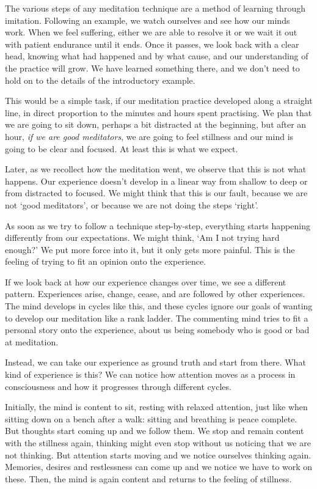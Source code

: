 The various steps of any meditation technique are a method of learning
through imitation. Following an example, we watch ourselves and see how
our minds work. When we feel suffering, either we are able to resolve it
or we wait it out with patient endurance until it ends. Once it passes,
we look back with a clear head, knowing what had happened and by what
cause, and our understanding of the practice will grow. We have learned
something there, and we don't need to hold on to the details of the
introductory example.


This would be a simple task, if our meditation practice developed along
a straight line, in direct proportion to the minutes and hours spent
practising. We plan that we are going to sit down, perhaps a bit
distracted at the beginning, but after an hour, \emph{if we are good
meditators}, we are going to feel stillness and our mind is going to be
clear and focused. At least this is what we expect.

Later, as we recollect how the meditation went, we observe that this is
not what happens. Our experience doesn't develop in a linear way from
shallow to deep or from distracted to focused. We might think that this
is our fault, because we are not `good meditators', or because we are
not doing the steps `right'.

As soon as we try to follow a technique step-by-step, everything starts
happening differently from our expectations. We might think, `Am I not
trying hard enough?' We put more force into it, but it only gets more
painful. This is the feeling of trying to fit an opinion onto the
experience.

If we look back at how our experience changes over time, we see a
different pattern. Experiences arise, change, cease, and are followed by
other experiences. The mind develops in cycles like this, and these
cycles ignore our goals of wanting to develop our meditation like a rank
ladder. The commenting mind tries to fit a personal story onto the
experience, about us being somebody who is good or bad at meditation.

Instead, we can take our experience as ground truth and start from
there. What kind of experience is this? We can notice how attention
moves as a process in consciousness and how it progresses through
different cycles.

Initially, the mind is content to sit, resting with relaxed attention,
just like when sitting down on a bench after a walk: sitting and
breathing is peace complete. But thoughts start coming up and we follow
them. We stop and remain content with the stillness again, thinking
might even stop without us noticing that we are not thinking. But
attention starts moving and we notice ourselves thinking again.
Memories, desires and restlessness can come up and we notice we have to
work on these. Then, the mind is again content and returns to the
feeling of stillness.

